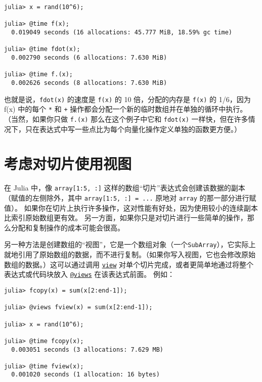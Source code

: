 \begin{verbatim}
julia> x = rand(10^6);

julia> @time f(x);
  0.019049 seconds (16 allocations: 45.777 MiB, 18.59% gc time)

julia> @time fdot(x);
  0.002790 seconds (6 allocations: 7.630 MiB)

julia> @time f.(x);
  0.002626 seconds (8 allocations: 7.630 MiB)
\end{verbatim}



也就是说，\texttt{fdot(x)} 的速度是 \texttt{f(x)} 的 10 倍，分配的内存是 \texttt{f(x)} 的 1/6，因为 f(x) 中的每个 \texttt{*} 和 \texttt{+} 操作都会分配一个新的临时数组并在单独的循环中执行。 （当然，如果你只做 \texttt{f.(x)} 那么在这个例子中它和 \texttt{fdot(x)} 一样快，但在许多情况下，只在表达式中写一些点比为每个向量化操作定义单独的函数更方便。）



\hypertarget{16479954806149442392}{}


\section{考虑对切片使用视图}



在 Julia 中，像 \texttt{array[1:5, :]} 这样的数组“切片”表达式会创建该数据的副本（赋值的左侧除外，其中 \texttt{array[1:5, :] = ...} 原地对 \texttt{array} 的那一部分进行赋值）。 如果你在切片上执行许多操作，这对性能有好处，因为使用较小的连续副本比索引原始数组更有效。 另一方面，如果你只是对切片进行一些简单的操作，那么分配和复制操作的成本可能会很高。



另一种方法是创建数组的“视图”，它是一个数组对象（一个\texttt{SubArray}），它实际上就地引用了原始数组的数据，而不进行复制。（如果你写入视图，它也会修改原始数组的数据。）这可以通过调用 \hyperlink{4861450464669906845}{\texttt{view}} 对单个切片完成，或者更简单地通过将整个表达式或代码块放入 \hyperlink{4544474300423667148}{\texttt{@views}} 在该表达式前面。 例如：




\begin{verbatim}
julia> fcopy(x) = sum(x[2:end-1]);

julia> @views fview(x) = sum(x[2:end-1]);

julia> x = rand(10^6);

julia> @time fcopy(x);
  0.003051 seconds (3 allocations: 7.629 MB)

julia> @time fview(x);
  0.001020 seconds (1 allocation: 16 bytes)
\end{verbatim}



